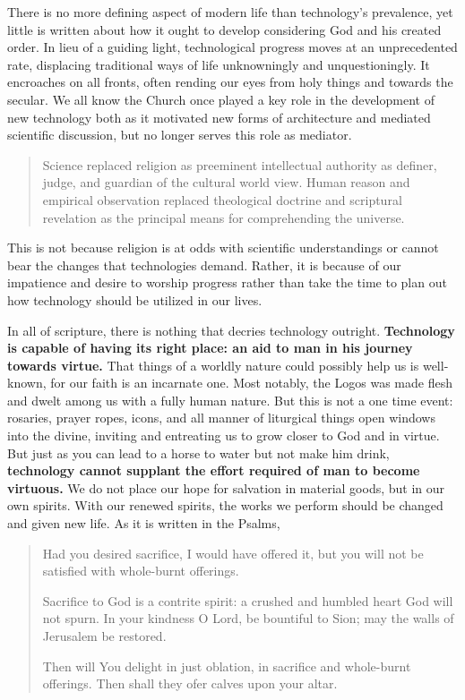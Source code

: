 \documentclass[letterpaper]{article}
\begin{document}
There is no more defining aspect of modern life than technology's prevalence, yet little is written about how it ought to develop considering God and his created order. In lieu of a guiding light, technological progress moves at an unprecedented rate, displacing traditional ways of life unknowningly and unquestioningly. It encroaches on all fronts, often rending our eyes from holy things and towards the secular. We all know the Church once played a key role in the development of new technology both as it motivated new forms of architecture and mediated scientific discussion, but no longer serves this role as mediator.

\begin{quote}
  Science replaced religion as preeminent intellectual authority as definer, judge, and guardian of the cultural world view. Human reason and empirical observation replaced theological doctrine and scriptural revelation as the principal means for comprehending the universe.
\end{quote}

This is not because religion is at odds with scientific understandings or cannot bear the changes that technologies demand. Rather, it is because of our impatience and desire to worship progress rather than take the time to plan out how technology should be utilized in our lives.

In all of scripture, there is nothing that decries technology outright. \textbf{Technology is capable of having its right place: an aid to man in his journey towards virtue.} That things of a worldly nature could possibly help us is well-known, for our faith is an incarnate one. Most notably, the Logos was made flesh and dwelt among us with a fully human nature. But this is not a one time event: rosaries, prayer ropes, icons, and all manner of liturgical things open windows into the divine, inviting and entreating us to grow closer to God and in virtue. But just as you can lead to a horse to water but not make him drink, \textbf{technology cannot supplant the effort required of man to become virtuous.} We do not place our hope for salvation in material goods, but in our own spirits. With our renewed spirits, the works we perform should be changed and given new life. As it is written in the Psalms,

\begin{quote}
  Had you desired sacrifice, I would have offered it,
  but you will not be satisfied with whole-burnt offerings.

  Sacrifice to God is a contrite spirit:
  a crushed and humbled heart God will not spurn.
  In your kindness O Lord, be bountiful to Sion;
  may the walls of Jerusalem be restored.

  Then will You delight in just oblation,
  in sacrifice and whole-burnt offerings.
  Then shall they ofer calves upon your altar.
\end{quote}
\end{document}
